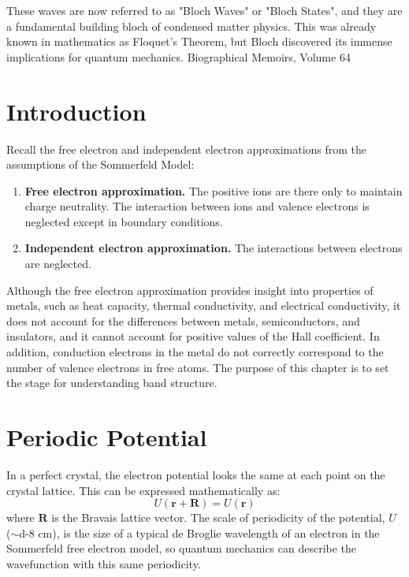 These waves are now referred to as "Bloch Waves" or "Bloch States", and they are a fundamental building bloch of condensed matter physics. This was already known in mathematics as Floquet's Theorem, but Bloch discovered its immense implications for quantum mechanics.
Biographical Memoirs, Volume 64

\section{Introduction}
Recall the free electron and independent electron approximations from the assumptions of the Sommerfeld Model:

\begin{enumerate}
	\item \textbf{Free electron approximation.} The positive ions are there only to maintain charge neutrality. The interaction between ions and valence electrons is neglected except in boundary conditions.
	\item \textbf{Independent electron approximation.} The interactions between electrons are neglected.
\end{enumerate}


Although the free electron approximation provides insight into properties of metals, such as heat capacity, thermal conductivity, and electrical conductivity, it does not account for the differences between metals, semiconductors, and insulators, and it cannot account for positive values of the Hall coefficient. In addition, conduction electrons in the metal do not correctly correspond to the number of valence electrons in free atoms. The purpose of this chapter is to set the stage for understanding band structure.

\section{Periodic Potential}


In a perfect crystal, the electron potential looks the same at each point on the crystal lattice. This can be expressed mathematically as:
\begin{equation} \label{eq:U_period}
	U(\boldsymbol{r} + \boldsymbol{R}) = U(\boldsymbol{r})
\end{equation}
where $\boldsymbol{R}$ is the Bravais lattice vector. The scale of periodicity of the potential, $U$ ($\sim$\num{d-8} cm), is the size of a typical de Broglie wavelength of an electron in the Sommerfeld free electron model, so quantum mechanics can describe the wavefunction with this same periodicity. 


